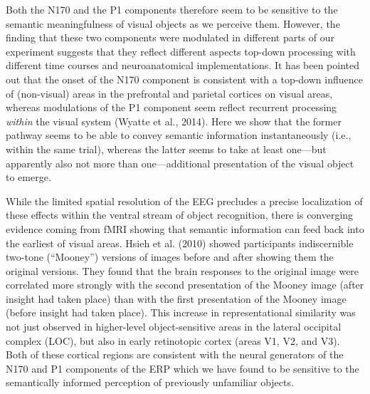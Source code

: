 \documentclass[
  english,
  man,floatsintext]{apa7}
\begin{document}
Both the N170 and the P1 components therefore seem to be sensitive to the semantic meaningfulness of visual objects as we perceive them. However, the finding that these two components were modulated in different parts of our experiment suggests that they reflect different aspects top-down processing with different time courses and neuroanatomical implementations. It has been pointed out that the onset of the N170 component is consistent with a top-down influence of (non-visual) areas in the prefrontal and parietal cortices on visual areas, whereas modulations of the P1 component seem reflect recurrent processing \emph{within} the visual system (Wyatte et al., 2014). Here we show that the former pathway seems to be able to convey semantic information instantaneously (i.e., within the same trial), whereas the latter seems to take at least one---but apparently also not more than one---additional presentation of the visual object to emerge.

While the limited spatial resolution of the EEG precludes a precise localization of these effects within the ventral stream of object recognition, there is converging evidence coming from fMRI showing that semantic information can feed back into the earliest of visual areas. Hsieh et al. (2010) showed participants indiscernible two-tone (\enquote{Mooney}) versions of images before and after showing them the original versions. They found that the brain responses to the original image were correlated more strongly with the second presentation of the Mooney image (after insight had taken place) than with the first presentation of the Mooney image (before insight had taken place). This increase in representational similarity was not just observed in higher-level object-sensitive areas in the lateral occipital complex (LOC), but also in early retinotopic cortex (areas V1, V2, and V3). Both of these cortical regions are consistent with the neural generators of the N170 and P1 components of the ERP which we have found to be sensitive to the semantically informed perception of previously unfamiliar objects.
\end{document}
